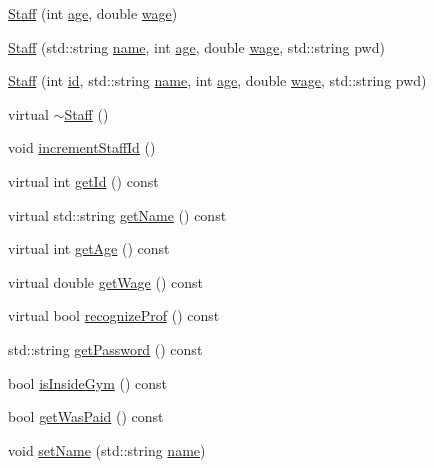 \begin{DoxyCompactItemize}
\item 
\hyperlink{classStaff_a94a7d66467d3946143dd9c5fe4ef4c6c}{Staff} (int \hyperlink{classStaff_ab36cd34fc6aa9c62ed9ca72263fd0ccc}{age}, double \hyperlink{classStaff_af84be4072f59d7c5c15d7c9cc07ea002}{wage})
\item 
\hyperlink{classStaff_a0b2629c64afc440decf47e6746def943}{Staff} (std\+::string \hyperlink{classStaff_ad0e56a6c5296a2138aed86dc0cf476cb}{name}, int \hyperlink{classStaff_ab36cd34fc6aa9c62ed9ca72263fd0ccc}{age}, double \hyperlink{classStaff_af84be4072f59d7c5c15d7c9cc07ea002}{wage}, std\+::string pwd)
\item 
\hyperlink{classStaff_a7d0a5c2377512828c73f88a4f7c2213c}{Staff} (int \hyperlink{classStaff_a2b5674cabb4b4e3a50cd130898d00c20}{id}, std\+::string \hyperlink{classStaff_ad0e56a6c5296a2138aed86dc0cf476cb}{name}, int \hyperlink{classStaff_ab36cd34fc6aa9c62ed9ca72263fd0ccc}{age}, double \hyperlink{classStaff_af84be4072f59d7c5c15d7c9cc07ea002}{wage}, std\+::string pwd)
\item 
virtual \hyperlink{classStaff_a1c2f98aad2fbd5ddf72e9ff92304cbfd}{$\sim$\+Staff} ()
\item 
void \hyperlink{classStaff_a440c94e1d94a37384bc0f54f2709c083}{increment\+Staff\+Id} ()
\item 
virtual int \hyperlink{classStaff_aaad9e092c09d644570cf4119e2c77368}{get\+Id} () const 
\item 
virtual std\+::string \hyperlink{classStaff_a75431ea3462f0862f00884842cb032a1}{get\+Name} () const 
\item 
virtual int \hyperlink{classStaff_acd4f7e81f745e6a5205acbdf9b6ada2c}{get\+Age} () const 
\item 
virtual double \hyperlink{classStaff_a191d2c46bc1b5be8899e55bc0823a920}{get\+Wage} () const 
\item 
virtual bool \hyperlink{classStaff_a3c0c4690bacca349c84f707004c3acb0}{recognize\+Prof} () const 
\item 
std\+::string \hyperlink{classStaff_a6cb9453d71022d92c93e364fe51c1c0c}{get\+Password} () const 
\item 
bool \hyperlink{classStaff_a3dc1d93121a3fe8630475f29fa68823f}{is\+Inside\+Gym} () const 
\item 
bool \hyperlink{classStaff_ab23c34f9b2807218af83802461cc44d8}{get\+Was\+Paid} () const 
\item 
void \hyperlink{classStaff_a6c6eb931f55c44a1cd21994f51807c54}{set\+Name} (std\+::string \hyperlink{classStaff_ad0e56a6c5296a2138aed86dc0cf476cb}{name})

\end{DoxyCompactItemize}
